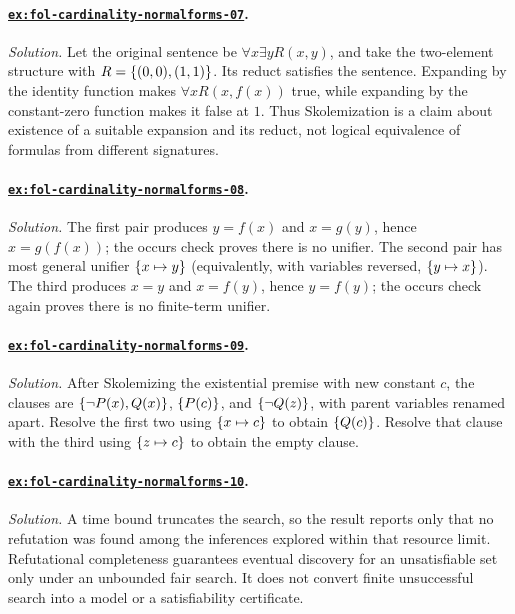 \documentclass[11pt,oneside,openany]{book}
\theoremstyle{definition}
\theoremstyle{plain}
\theoremstyle{remark}
\DeclarePairedDelimiter{\set}{\lbrace}{\rbrace}
\begin{document}
\paragraph{\hyperref[ex:fol-cardinality-normalforms-07]{\texttt{ex:fol-cardinality-normalforms-07}}.}
\textit{Solution.}  Let the original sentence be
\(\forall x\exists yR(x,y)\), and take the two-element structure with
\(R=\set{(0,0),(1,1)}\).  Its reduct satisfies the sentence.  Expanding by the
identity function makes \(\forall xR(x,f(x))\) true, while expanding by the
constant-zero function makes it false at \(1\).  Thus Skolemization is a claim
about existence of a suitable expansion and its reduct, not logical
equivalence of formulas from different signatures.

\paragraph{\hyperref[ex:fol-cardinality-normalforms-08]{\texttt{ex:fol-cardinality-normalforms-08}}.}
\textit{Solution.}  The first pair produces \(y=f(x)\) and
\(x=g(y)\), hence \(x=g(f(x))\); the occurs check proves there is no unifier.
The second pair has most general unifier \(\set{x\mapsto y}\) (equivalently,
with variables reversed, \(\set{y\mapsto x}\)).  The third produces
\(x=y\) and \(x=f(y)\), hence \(y=f(y)\); the occurs check again proves there
is no finite-term unifier.

\paragraph{\hyperref[ex:fol-cardinality-normalforms-09]{\texttt{ex:fol-cardinality-normalforms-09}}.}
\textit{Solution.}  After Skolemizing the existential premise with new constant
\(c\), the clauses are
\(\set{\neg P(x),Q(x)}\), \(\set{P(c)}\), and
\(\set{\neg Q(z)}\), with parent variables renamed apart.  Resolve the first
two using \(\set{x\mapsto c}\) to obtain \(\set{Q(c)}\).  Resolve that clause
with the third using \(\set{z\mapsto c}\) to obtain the empty clause.

\paragraph{\hyperref[ex:fol-cardinality-normalforms-10]{\texttt{ex:fol-cardinality-normalforms-10}}.}
\textit{Solution.}  A time bound truncates the search, so the result reports
only that no refutation was found among the inferences explored within that
resource limit.  Refutational completeness guarantees eventual discovery for
an unsatisfiable set only under an unbounded fair search.  It does not convert
finite unsuccessful search into a model or a satisfiability certificate.
\end{document}
